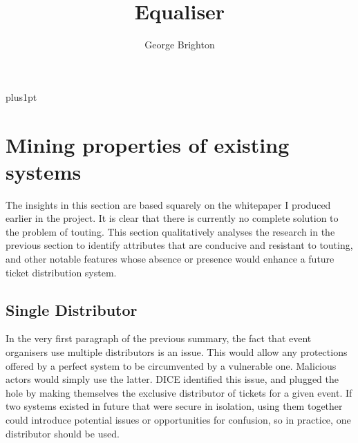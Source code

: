 \documentclass[12pt]{bhamdissertation}
\title{Equaliser}
\author{George Brighton}             %
\begin{document}
\baselineskip=18pt plus1pt

\setcounter{secnumdepth}{3}
\setcounter{tocdepth}{1}

\maketitle                  %

\begin{romanpages}          %

\tableofcontents

\cleardoublepage{}
\begin{abstract}
\lipsum[1-1] %
\end{abstract}

\cleardoublepage{}
\begin{acknowledgements}
\lipsum[2-2] %
\end{acknowledgements}

\end{romanpages}            %

\chapter{Mining properties of existing systems}

The insights in this section are based squarely on the whitepaper \autocite{B17} I produced earlier in the project. It is clear that there is currently no complete solution to the problem of touting. This section qualitatively analyses the research in the previous section to identify attributes that are conducive and resistant to touting, and other notable features whose absence or presence would enhance a future ticket distribution system.

\section{Single Distributor}

In the very first paragraph of the previous summary, the fact that event organisers use multiple distributors is an issue. This would allow any protections offered by a perfect system to be circumvented by a vulnerable one. Malicious actors would simply use the latter. DICE identified this issue, and plugged the hole by making themselves the exclusive distributor of tickets for a given event. If two systems existed in future that were secure in isolation, using them together could introduce potential issues or opportunities for confusion, so in practice, one distributor should be used.
\end{document}
